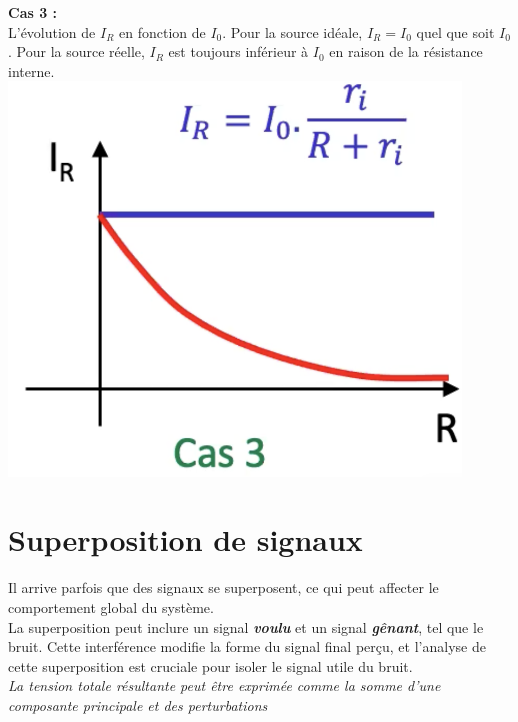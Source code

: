 \hfill
\vline
\hfill
\begin{minipage}[t]{0.3\textwidth}
\small
\textbf{Cas 3 :}\\
L'évolution de $I_R$ en fonction de $I_0$. Pour la source idéale, $I_R = I_0$ quel que soit $I_0$. Pour la source réelle, $I_R$ est toujours inférieur à $I_0$ en raison de la résistance interne.
\vfill \centering
\includegraphics[width=0.90\textwidth]{chapters/chapter1/images/cas3_i.png}
\end{minipage}
\newpage
\section{Superposition de signaux}

Il arrive parfois que des signaux se superposent, ce qui peut affecter le comportement global du système. \\
La superposition peut inclure un signal \textbf{\textit{voulu}} et un signal \textbf{\textit{gênant}}, tel que le bruit. Cette interférence modifie la forme du signal final perçu, et l'analyse de cette superposition est cruciale pour isoler le signal utile du bruit. \\
\textit{La tension totale résultante peut être exprimée comme la somme d'une composante principale et des perturbations }

